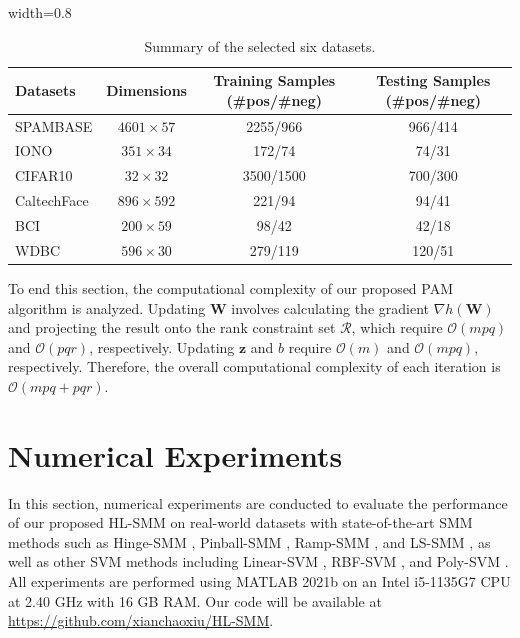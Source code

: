 \documentclass[sn-mathphys]{JORSC-jnl}%
\theoremstyle{thmstyleone}%
\theoremstyle{thmstylethree}%
\theoremstyle{thmstyleone} %
\begin{document}
\begin{table}[t]
\caption{Summary of the selected six datasets.} \label{datatab}
\centering
\renewcommand{\arraystretch}{1.12}
\begin{adjustbox}{width=0.8\textwidth}
\begin{tabular}{lccc}
\toprule
Datasets & Dimensions & Training Samples (\#pos/\#neg) & Testing Samples (\#pos/\#neg) \\
\midrule
SPAMBASE     & $4601\times57$                 & 2255/966 & 966/414 \\
IONO   & $351\times34$                 & 172/74    & 74/31   \\
CIFAR10    & $32\times32$                   & 3500/1500 & 700/300  \\
CaltechFace & $896\times592$                 & 221/94       & 94/41     \\
BCI  & $200\times59$                  & 98/42     & 42/18   \\
WDBC  & $596\times30$                  & 279/119   & 120/51  \\ \bottomrule
\end{tabular}
\end{adjustbox}
\end{table}


To end this section, the computational complexity of our proposed PAM algorithm is analyzed.
Updating $\mathbf{W}$ involves calculating the gradient $\nabla h(\mathbf{W})$ and projecting the result onto the rank constraint set $\mathcal{R}$, which require  $\mathcal{O}(mpq)$ and $\mathcal{O}(pqr)$, respectively.
Updating $\mathbf{z}$ and $b$ require $\mathcal{O}(m)$ and $\mathcal{O}(mpq)$, respectively.
Therefore, the overall computational complexity of each iteration is $\mathcal{O}(mpq + pqr)$.

\section{Numerical Experiments}\label{sec4}
In this section, numerical experiments are conducted to evaluate the performance of our proposed HL-SMM on real-world datasets with state-of-the-art SMM methods such as Hinge-SMM \cite{luo2015support}, Pinball-SMM \cite{feng2022support}, Ramp-SMM \cite{gu2021ramp}, and LS-SMM \cite{liang2022adaptive}, as well as other SVM methods including Linear-SVM \cite{cortes1995support}, RBF-SVM \cite{boser1992training}, and Poly-SVM \cite{shen2025bafl}. All experiments are performed using MATLAB 2021b on an Intel i5-1135G7 CPU at 2.40 GHz with 16 GB RAM. Our code will be available at \url{https://github.com/xianchaoxiu/HL-SMM}.
\end{document}
